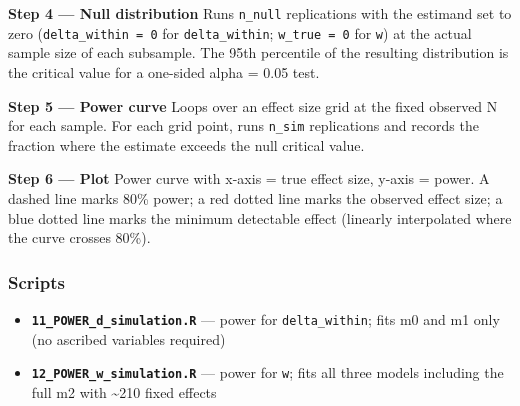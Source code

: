 \documentclass[
]{article}
\providecommand{\tightlist}{%
  \setlength{\itemsep}{0pt}\setlength{\parskip}{0pt}}
\begin{document}
\textbf{Step 4 --- Null distribution} Runs \texttt{n\_null} replications
with the estimand set to zero (\texttt{delta\_within\ =\ 0} for
\texttt{delta\_within}; \texttt{w\_true\ =\ 0} for \texttt{w}) at the
actual sample size of each subsample. The 95th percentile of the
resulting distribution is the critical value for a one-sided alpha =
0.05 test.

\textbf{Step 5 --- Power curve} Loops over an effect size grid at the
fixed observed N for each sample. For each grid point, runs
\texttt{n\_sim} replications and records the fraction where the estimate
exceeds the null critical value.

\textbf{Step 6 --- Plot} Power curve with x-axis = true effect size,
y-axis = power. A dashed line marks 80\% power; a red dotted line marks
the observed effect size; a blue dotted line marks the minimum
detectable effect (linearly interpolated where the curve crosses 80\%).

\subsubsection{Scripts}\label{scripts}

\begin{itemize}
\tightlist
\item
  \textbf{\texttt{11\_POWER\_d\_simulation.R}} --- power for
  \texttt{delta\_within}; fits m0 and m1 only (no ascribed variables
  required)
\item
  \textbf{\texttt{12\_POWER\_w\_simulation.R}} --- power for \texttt{w};
  fits all three models including the full m2 with \textasciitilde210
  fixed effects
\end{itemize}
\end{document}
